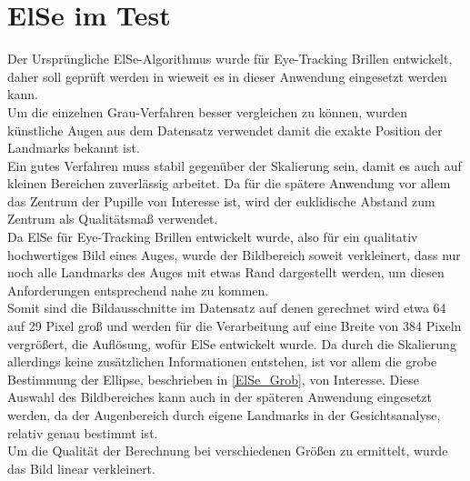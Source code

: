 \section{ElSe im Test}
Der Ursprüngliche ElSe-Algorithmus wurde für Eye-Tracking Brillen entwickelt, daher soll geprüft werden in wieweit es in dieser Anwendung eingesetzt werden kann.\\
Um die einzelnen Grau-Verfahren besser vergleichen zu können, wurden künstliche Augen aus dem Datensatz \cite{database_Eye} verwendet damit die exakte Position der Landmarks bekannt ist.\\
Ein gutes Verfahren muss stabil gegenüber der Skalierung sein, damit es auch auf kleinen Bereichen zuverlässig arbeitet. Da für die spätere Anwendung vor allem das Zentrum der Pupille von Interesse ist, wird der euklidische Abstand zum Zentrum als Qualitätsmaß verwendet.\\
Da ElSe für Eye-Tracking Brillen entwickelt wurde, also für ein qualitativ hochwertiges Bild eines Auges, wurde der Bildbereich soweit verkleinert, dass nur noch alle Landmarks des Auges mit etwas Rand dargestellt werden, um diesen Anforderungen entsprechend nahe zu kommen.\\
Somit sind die Bildausschnitte im Datensatz auf denen gerechnet wird etwa 64 auf 29 Pixel groß und werden für die Verarbeitung auf eine Breite von 384 Pixeln vergrößert, die Auflösung, wofür ElSe entwickelt wurde. Da durch die Skalierung allerdings keine zusätzlichen Informationen entstehen, ist vor allem die grobe Bestimmung der Ellipse, beschrieben in \autoref{ElSe_Grob}, von Interesse. Diese Auswahl des Bildbereiches kann auch in der späteren Anwendung eingesetzt werden, da der Augenbereich durch eigene Landmarks in der Gesichtsanalyse, relativ genau bestimmt ist.\\
Um die Qualität der Berechnung bei verschiedenen Größen zu ermittelt, wurde das Bild linear verkleinert.
